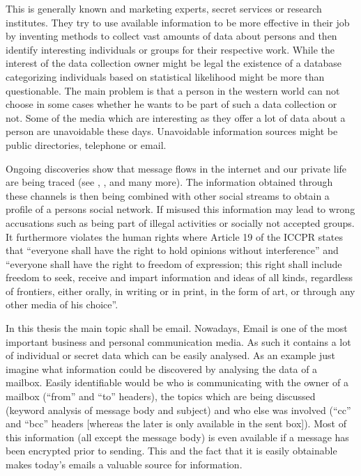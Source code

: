 \documentclass[twocolumn,a4paper,10pt,english]{scrartcl}
\begin{document}
This is generally known and marketing experts, secret services or research institutes. They try to use available information to be more effective in their job by inventing methods to collect vast amounts of data about persons and then identify interesting individuals or groups for their respective work. While the interest of the data collection owner might be legal the existence of a database categorizing individuals based on statistical likelihood might be more than questionable. The main problem is that a person in the western world can not choose in some cases whether he wants to be part of such a data collection or not. Some of the media which are interesting as they offer a lot of data about a person are unavoidable these days. Unavoidable information sources might be public directories, telephone or email.\par

Ongoing discoveries show that message flows in the internet and our private life are being traced (see \cite{ECHELON}, \cite{wiki:prism}, \cite{wiki:tempora} and many more). The information obtained through these channels is then being combined with other social streams to obtain a profile of a persons social network. If misused this information may lead to wrong accusations such as being part of illegal activities or socially not accepted groups. It furthermore violates the human rights where Article 19 of the ICCPR states that ``everyone shall have the right to hold opinions without interference'' and ``everyone shall have the right to freedom of expression; this right shall include freedom to seek, receive and impart information and ideas of all kinds, regardless of frontiers, either orally, in writing or in print, in the form of art, or through any other media of his choice''\cite{iccpr}.\par

In this thesis the main topic shall be email. Nowadays, Email is one of the most important business and personal communication media. As such it contains a lot of individual or secret data which can be easily analysed. As an example just imagine what information could be discovered by analysing the data of a mailbox. Easily identifiable would be who is communicating with the owner of a mailbox (``from'' and ``to'' headers), the topics which are being discussed (keyword analysis of message body and subject) and who else was involved (``cc'' and ``bcc'' headers [whereas the later is only available in the sent box]). Most of this information (all except the message body) is even available if a message has been encrypted prior to sending. This and the fact that it is easily obtainable makes today’s emails a valuable source for information.\par
\end{document}
